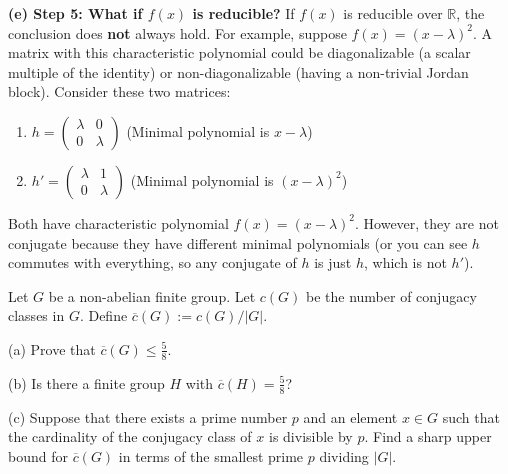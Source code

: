 \begin{solution}
\textbf{(e) Step 5: What if $f(x)$ is reducible?}
If $f(x)$ is reducible over $\mathbb{R}$, the conclusion does \textbf{not} always hold. 
For example, suppose $f(x) = (x-\lambda)^2$. A matrix with this characteristic polynomial could be diagonalizable (a scalar multiple of the identity) or non-diagonalizable (having a non-trivial Jordan block).
Consider these two matrices:
\begin{enumerate}
    \item $h = \begin{pmatrix} \lambda & 0 \\ 0 & \lambda \end{pmatrix}$ (Minimal polynomial is $x-\lambda$)
    \item $h' = \begin{pmatrix} \lambda & 1 \\ 0 & \lambda \end{pmatrix}$ (Minimal polynomial is $(x-\lambda)^2$)
\end{enumerate}
Both have characteristic polynomial $f(x) = (x-\lambda)^2$. However, they are not conjugate because they have different minimal polynomials (or you can see $h$ commutes with everything, so any conjugate of $h$ is just $h$, which is not $h'$).
\end{solution}

\begin{exercise}
\label{algebra:2010:3}
Let $G$ be a non-abelian finite group. Let $c(G)$ be the number of conjugacy classes in $G$. Define $\overline{c}(G) := c(G)/|G|$.

(a) Prove that $\overline{c}(G) \leq \frac{5}{8}$.

(b) Is there a finite group $H$ with $\overline{c}(H) = \frac{5}{8}$?

(c) Suppose that there exists a prime number $p$ and an element $x \in G$ such that the cardinality of the conjugacy class of $x$ is divisible by $p$. Find a sharp upper bound for $\overline{c}(G)$ in terms of the smallest prime $p$ dividing $|G|$.
\end{exercise}

